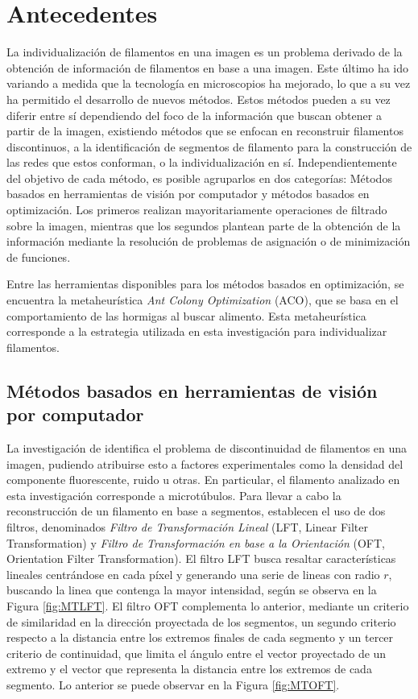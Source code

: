 \chapter{Antecedentes}
\label{chap:stateoftheart}
La individualizaci\'on de filamentos en una imagen es un problema derivado de la obtenci\'on de informaci\'on de filamentos en base a una imagen. Este \'ultimo ha ido variando a medida que la tecnolog\'ia en microscopios ha mejorado, lo que a su vez ha permitido el desarrollo de nuevos m\'etodos. Estos m\'etodos pueden a su vez diferir entre s\'i dependiendo del foco de la informaci\'on que buscan obtener a partir de la imagen, existiendo m\'etodos que se enfocan en reconstruir filamentos discontinuos, a la identificaci\'on de segmentos de filamento para la construcci\'on de las redes que estos conforman, o la individualizaci\'on en s\'i. Independientemente del objetivo de cada m\'etodo, es posible agruparlos en dos categor\'ias: M\'etodos basados en herramientas de visi\'on por computador y m\'etodos basados en optimizaci\'on. Los primeros realizan mayoritariamente operaciones de filtrado sobre la imagen, mientras que los segundos plantean parte de la obtenci\'on de la informaci\'on mediante la resoluci\'on de problemas de asignaci\'on o de minimizaci\'on de funciones.

Entre las herramientas disponibles para los m\'etodos basados en optimizaci\'on, se encuentra la metaheur\'istica {\it Ant Colony Optimization} (ACO), que se basa en el comportamiento de las hormigas al buscar alimento. Esta metaheur\'istica corresponde a la estrategia utilizada en esta investigaci\'on para individualizar filamentos.


\section{M\'etodos basados en herramientas de visi\'on por computador}
\label{sec:NonIndividualizationMethods}

La investigaci\'on de \cite{zhang2017extracting} identifica el problema de discontinuidad de filamentos en una imagen, pudiendo atribuirse esto a factores experimentales como la densidad del componente fluorescente, ruido u otras. En particular, el filamento analizado en esta investigaci\'on corresponde a microt\'ubulos. Para llevar a cabo la reconstrucci\'on de un filamento en base a segmentos, establecen el uso de dos filtros, denominados \textit{Filtro de Transformaci\'on Lineal} (LFT, Linear Filter Transformation) y \textit{Filtro de Transformaci\'on en base a la Orientaci\'on} (OFT, Orientation Filter Transformation). 
El filtro LFT busca resaltar caracter\'isticas lineales centr\'andose en cada p\'ixel y generando una serie de lineas con radio $r$, buscando la linea que contenga la mayor intensidad, seg\'un se observa en la Figura \ref{fig:MTLFT}. El filtro OFT complementa lo anterior, mediante un criterio de similaridad en la direcci\'on proyectada de los segmentos, un segundo criterio respecto a la distancia entre los extremos finales de cada segmento y un tercer criterio de continuidad, que limita el \'angulo entre el vector proyectado de un extremo y el vector que representa la distancia entre los extremos de cada segmento. Lo anterior se puede observar en la Figura \ref{fig:MTOFT}.

